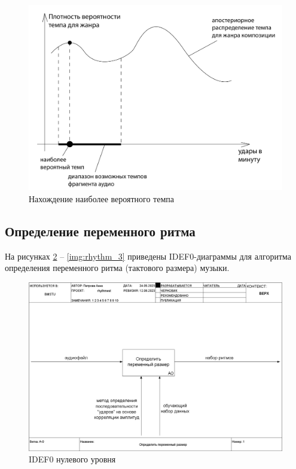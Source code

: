 \begin{figure}[h]
	\centering
	\includegraphics[scale=0.5]{svg/res_tempo.pdf}
	\caption{Нахождение наиболее вероятного темпа}
	\label{img:res_tempo}
\end{figure}

\clearpage

\subsection{Определение переменного ритма}

На рисунках \ref{img:rhythm_0} -- \ref{img:rhythm_3} приведены IDEF0-диаграммы для алгоритма определения переменного ритма (тактового размера) музыки.

\begin{figure}[h]
	\centering
	\includegraphics[scale=0.25]{inc/img/rhythm_idef/01_A-0.png}
	\caption{IDEF0 нулевого уровня}
	\label{img:rhythm_0}
\end{figure}

